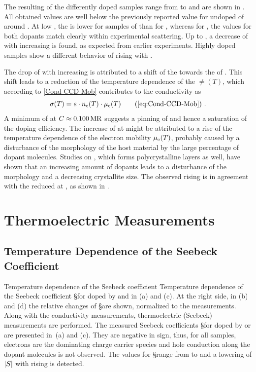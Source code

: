 The resulting \Eact of the differently doped samples range from \Eact[54] to  and are shown in . All obtained values are well below the previously reported value for undoped \CS of around \cite{Li2006}.
At low \C, the \Eact is lower for samples of \CrPd than for \WPd, whereas for , the values for both dopants match clearly within experimental scattering.
Up to \C[0.100], a decrease of \Eact with increasing \C is found, as expected from earlier experiments\cite{Pfeiffer1998,Li2006}.
Highly doped samples show a different behavior of rising \Eact with \CLong.

The drop of \Eact with increasing \C is attributed to a shift of the \EfLong towards the \EtLong of \CS.
This shift leads to a reduction of the temperature dependence of the \neLong $\ne(T)$, which according to \eqref{Cond-CCD-Mob} contributes to the conductivity as
\begin{equation}
\c(T) = e \cdot \ne(T) \cdot \mobe(T) \tag{\ref{eq:Cond-CCD-Mob}}
\PUNKT
\end{equation}
%
A minimum of \Eact at $\C\approx\mr{0.100}$ suggests a pinning of \Ef and hence a saturation of the doping efficiency.
%
The increase of \Eact at  might be attributed to a rise of the temperature dependence of the electron mobility $\mobe(T)$, probably caused by a disturbance of the morphology of the host material by the large percentage of dopant molecules. Studies on \pen, which forms polycrystalline layers as well, have shown that an increasing amount of dopants leads to a disturbance of the morphology and a decreasing crystallite size\cite{Kleemann2012a}.
The observed rising \Eact is in agreement with the reduced \cLong at , as shown in .


\section{Thermoelectric Measurements}%
\label{sec:ResPd-S}
\subsection{Temperature Dependence of the Seebeck Coefficient}
\label{sec:ResPd-S-T}
{Temperature dependence of the Seebeck coefficient}%
{Temperature dependence of the Seebeck coefficient \S for \CS doped by \CrPd and \WPd in (a) and (c). At the right side, in (b) and (d) the relative changes of \S are shown, normalized to the \Tm[40] measurements.
}%
%
Along with the conductivity measurements, thermoelectric (Seebeck) measurements are performed. The measured Seebeck coefficients \S for \CS doped by \CrPd or \WPd are presented in \,(a) and (c). They are negative in sign, thus, for all samples, electrons are the dominating charge carrier species and hole conduction along the dopant molecules is not observed. The values for \S range from  to  and a lowering of $|\S|$ with rising \C is detected.

